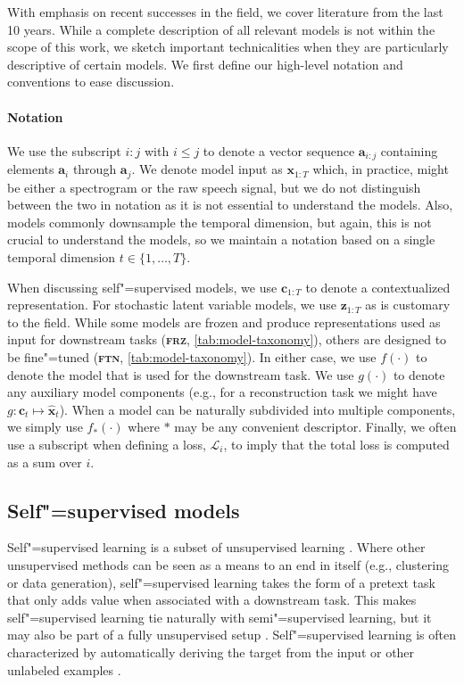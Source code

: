 {With emphasis on recent successes in the field, we cover literature from the last 10 years. While a complete description of all relevant models is not within the scope of this work, we sketch important technicalities when they are particularly descriptive of certain models. We first define our high-level notation and conventions to ease discussion.

\paragraph{Notation}
We use the subscript $i{:}j$ with $i{\leq}j$ to denote a vector sequence $\textbf{a}_{i:j}$ containing elements $\textbf{a}_{i}$ through $\textbf{a}_{j}$. We denote model input as $\mathbf{x}_{1:T}$ which, in practice, might be either a spectrogram or the raw speech signal, but we do not distinguish between the two in notation as it is not essential to understand the models. Also, models commonly downsample the temporal dimension, but again, this is not crucial to understand the models, so we maintain a notation based on a single temporal dimension $t\in\{1,\dots, T\}$.

When discussing self"=supervised models, we use $\mathbf{c}_{1:T}$ to denote a contextualized representation. For stochastic latent variable models, we use $\mathbf{z}_{1:T}$ as is customary to the field. 
While some models are frozen and produce representations used as input for downstream tasks (\textbf{\textsc{frz}}, \cref{tab:model-taxonomy}), others are designed to be fine"=tuned (\textbf{\textsc{ftn}}, \cref{tab:model-taxonomy}). In either case, we use $f(\cdot)$ to denote the model that is used for the downstream task. We use $g(\cdot)$ to denote any auxiliary model components (e.g., for a reconstruction task we might have $g: \mathbf{c}_t \mapsto \hat{\mathbf{x}}_t$). When a model can be naturally subdivided into multiple components, we simply use $f_*(\cdot)$ where $*$ may be any convenient descriptor. Finally, we often use a subscript when defining a loss, $\mathcal{L}_i$, to imply that the total loss is computed as a sum over $i$.


\subsection{Self"=supervised models}
\label{sec:ssmodels}

Self"=supervised learning is a subset of unsupervised learning \parencite{tsai_selfsupervised_2021}. Where other unsupervised methods can be seen as a means to an end in itself (e.g., clustering or data generation), self"=supervised learning takes the form of a pretext task that only adds value when associated with a downstream task. This makes self"=supervised learning tie naturally with semi"=supervised learning, but it may also be part of a fully unsupervised setup \parencite{baevski_unsupervised_2021}. Self"=supervised learning is often characterized by automatically deriving the target from the input or other unlabeled examples \parencite{ouali_overview_2020}.

}
